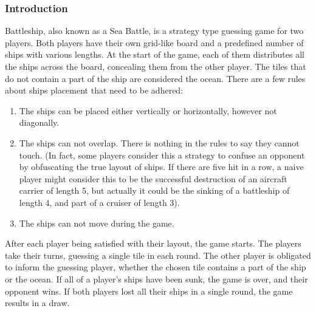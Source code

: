 \documentclass{article}
\begin{document}
\begin{multicols}{2}
\subsubsection{Introduction}
Battleship, also known as a Sea Battle, is a strategy type guessing game for two players. Both players have their own grid-like board and a predefined number of ships with various lengths. At the start of the game, each of them distributes all the ships across the board, concealing them from the other player. The tiles that do not contain a part of the ship are considered the ocean. There are a few rules about ships placement that need to be adhered:
\begin{enumerate}
    \item The ships can be placed either vertically or horizontally, however not diagonally.
    \item The ships can not overlap. There is nothing in the rules to say they cannot touch. (In fact, some players consider this a strategy to confuse an opponent by obfuscating the true layout of ships. If there are five hit in a row, a naive player might consider this to be the successful destruction of an aircraft carrier of length 5, but actually it could be the sinking of a battleship of length 4, and part of a cruiser of length 3).
    \item The ships can not move during the game.
\end{enumerate}
After each player being satisfied with their layout, the game starts. The players take their turns, guessing a single tile in each round. The other player is obligated to inform the guessing player, whether the chosen tile contains a part of the ship or the ocean. If all of a player's ships have been sunk, the game is over, and their opponent wins. If both players lost all their ships in a single round, the game results in a draw.

\end{multicols}
\end{document}
